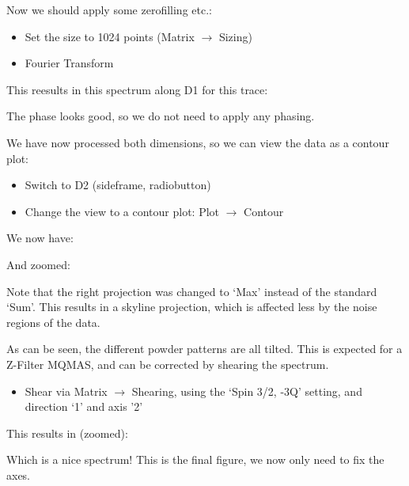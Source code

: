 \documentclass[11pt,a4paper]{article}
\begin{document}
Now we should apply some zerofilling etc.:
\begin{itemize}
	\item Set the size to 1024 points (Matrix $\longrightarrow$ Sizing)
	\item Fourier Transform
\end{itemize}
This reesults in this spectrum along D1 for this trace:
\begin{center}
\end{center}
The phase looks good, so we do not need to apply any phasing.

We have now processed both dimensions, so we can view the data as a contour plot:
\begin{itemize}
	\item Switch to D2 (sideframe, radiobutton)
	\item Change the view to a contour plot: Plot  $\longrightarrow$ Contour
\end{itemize}
We now have:
\begin{center}
\end{center}
And zoomed:
\begin{center}
\end{center}
Note that the right projection was changed to `Max' instead of the standard `Sum'.
This results in a skyline projection, which is affected less by the noise regions of the data.

As can be seen, the different powder patterns are all tilted.
This is expected for a Z-Filter MQMAS, and can be corrected by shearing the spectrum.
\begin{itemize}
	\item Shear via Matrix $\longrightarrow$ Shearing, using the `Spin 3/2, -3Q' setting, and
	  direction `1' and axis '2'
\end{itemize}
This results in (zoomed):
\begin{center}
\end{center}
Which is a nice spectrum! This is the final figure, we now only need to fix the axes.
\end{document}
